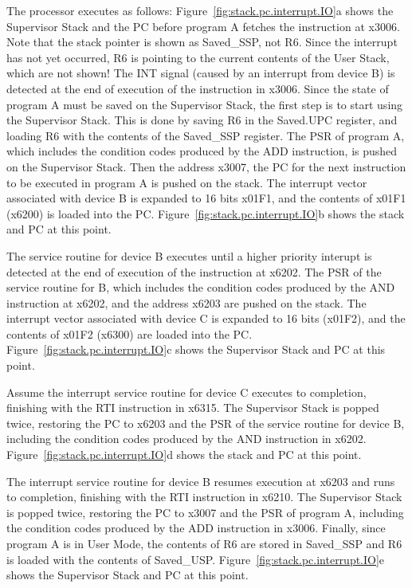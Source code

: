 \documentclass{patt}
\begin{document}
The processor executes as follows: Figure~\ref{fig:stack.pc.interrupt.IO}a
shows the Supervisor Stack and the PC before program A fetches the 
instruction at x3006.  Note that the stack pointer is shown as Saved\_SSP,
not R6.  Since the interrupt has not yet occurred, R6 is pointing to the
current contents of the User Stack, which are not shown!  The INT signal 
(caused by an interrupt from device B) is detected at the end of execution 
of the instruction in
x3006.  Since the state of program A must be saved on the Supervisor Stack,
the first step is to start using the Supervisor Stack. This is done by 
saving R6 in the Saved.UPC register, and loading R6 with the contents of the
Saved\_SSP register.  The PSR of program A, which includes the condition codes
produced by the ADD instruction, is pushed on the Supervisor Stack.  Then the
address x3007, the PC for the next instruction to be executed in program A
is pushed on the stack.  The interrupt vector associated with device B is
expanded to 16 bits x01F1, and the contents of x01F1 (x6200) is loaded into
the PC.  Figure~\ref{fig:stack.pc.interrupt.IO}b shows the stack and PC at
this point.

The service routine for device B executes until a higher priority interupt
is detected at the end of execution of the instruction at x6202.  The PSR
of the service routine for B, which includes the condition codes produced by
the AND instruction at x6202, and the address x6203 are pushed on the stack.
The interrupt vector associated with device C is expanded to 16 bits (x01F2),
and the contents of x01F2 
(x6300) are loaded into the
PC. Figure~\ref{fig:stack.pc.interrupt.IO}c shows the Supervisor Stack
and PC at this point.

Assume the interrupt service routine for device C executes to completion,
finishing with the RTI instruction in x6315. The Supervisor Stack is
popped twice, restoring the PC to x6203 and the PSR of the service routine 
for device B, including the condition codes produced by the AND instruction in
x6202.  Figure~\ref{fig:stack.pc.interrupt.IO}d shows the stack and PC
at this point.

The interrupt service routine for device B resumes execution at x6203
and runs to completion, finishing with the RTI instruction in x6210.
The Supervisor Stack is popped twice, restoring the PC to x3007 and
the PSR of program A, including the condition codes produced by the ADD 
instruction in x3006.  Finally, since program A is in
User Mode, the contents of R6 are stored in Saved\_SSP and R6 is loaded
with the contents of
Saved\_USP. Figure~\ref{fig:stack.pc.interrupt.IO}e shows the
Supervisor Stack and PC at this point.
\end{document}
